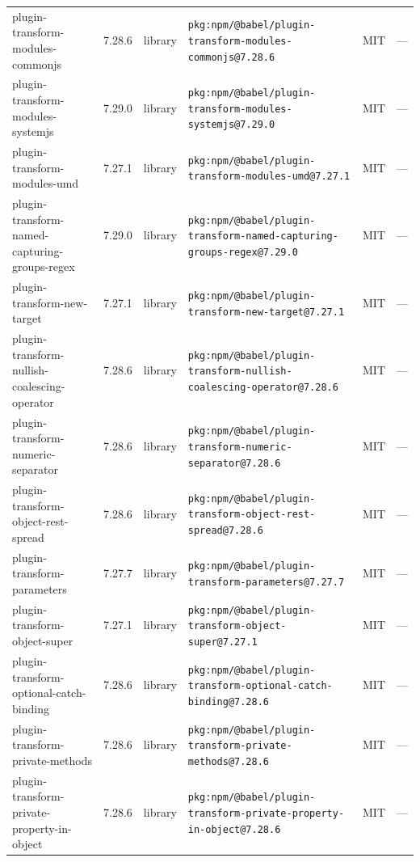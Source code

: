 \documentclass[11pt,a4paper]{article}
\begin{document}
\begin{longtable}{|p{4cm}|p{2cm}|p{1.6cm}|p{5cm}|p{1.5cm}|p{3.5cm}|}
\raggedright plugin-transform-modules-commonjs & 7.28.6 & library & \small\texttt{pkg:npm/@babel/plugin-transform-modules-commonjs@7.28.6} & MIT & \small — \\
\raggedright plugin-transform-modules-systemjs & 7.29.0 & library & \small\texttt{pkg:npm/@babel/plugin-transform-modules-systemjs@7.29.0} & MIT & \small — \\
\raggedright plugin-transform-modules-umd & 7.27.1 & library & \small\texttt{pkg:npm/@babel/plugin-transform-modules-umd@7.27.1} & MIT & \small — \\
\raggedright plugin-transform-named-capturing-groups-regex & 7.29.0 & library & \small\texttt{pkg:npm/@babel/plugin-transform-named-capturing-groups-regex@7.29.0} & MIT & \small — \\
\raggedright plugin-transform-new-target & 7.27.1 & library & \small\texttt{pkg:npm/@babel/plugin-transform-new-target@7.27.1} & MIT & \small — \\
\raggedright plugin-transform-nullish-coalescing-operator & 7.28.6 & library & \small\texttt{pkg:npm/@babel/plugin-transform-nullish-coalescing-operator@7.28.6} & MIT & \small — \\
\raggedright plugin-transform-numeric-separator & 7.28.6 & library & \small\texttt{pkg:npm/@babel/plugin-transform-numeric-separator@7.28.6} & MIT & \small — \\
\raggedright plugin-transform-object-rest-spread & 7.28.6 & library & \small\texttt{pkg:npm/@babel/plugin-transform-object-rest-spread@7.28.6} & MIT & \small — \\
\raggedright plugin-transform-parameters & 7.27.7 & library & \small\texttt{pkg:npm/@babel/plugin-transform-parameters@7.27.7} & MIT & \small — \\
\raggedright plugin-transform-object-super & 7.27.1 & library & \small\texttt{pkg:npm/@babel/plugin-transform-object-super@7.27.1} & MIT & \small — \\
\raggedright plugin-transform-optional-catch-binding & 7.28.6 & library & \small\texttt{pkg:npm/@babel/plugin-transform-optional-catch-binding@7.28.6} & MIT & \small — \\
\raggedright plugin-transform-private-methods & 7.28.6 & library & \small\texttt{pkg:npm/@babel/plugin-transform-private-methods@7.28.6} & MIT & \small — \\
\raggedright plugin-transform-private-property-in-object & 7.28.6 & library & \small\texttt{pkg:npm/@babel/plugin-transform-private-property-in-object@7.28.6} & MIT & \small — \\

\end{longtable}
\end{document}
